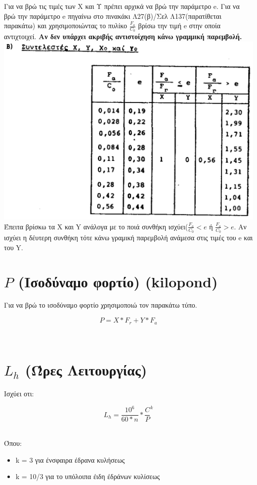 \documentclass{article}
\begin{document}
Για να βρώ τις τιμές των Χ και Υ πρέπει αρχικά να βρώ την παράμετρο e. Για να βρώ την παράμετρο e πηγαίνω στο πινακάκι Λ27(β)/Σελ Λ137(παρατίθεται παρακάτω) και χρησιμοποιώντας το πυλίκο \textbf{$\frac{F_a}{C_0}$} βρίσω την τιμή e στην οποία αντιχτοιχεί. \textbf{Αν δεν υπάρχει ακριβής αντιστοίχηση κάνω γραμμική παρεμβολή.} 
\\
\includegraphics[width=\linewidth]{2.png}
\\Έπειτα βρίσκω τα X και Y ανάλογα με το ποιά συνθήκη ισχύει($\frac{F_a}{C_0} < e$ ή $\frac{F_a}{C_0} > e$. Αν ισχύει η δέυτερη συνθήκη τότε κάνω γραμική παρεμβολή ανάμεσα στις τιμές του e και του Y.

\section{$P$ (Ισοδύναμο φορτίο) \tiny{(kilopond)}}
Για να βρώ το ισοδύναμο φορτίο χρησιμοποιώ τον παρακάτω τύπο.
\begin{center}
    \[ P = X*F_r + Y*F_a \]
\end{center}
\\


\section{$L_h$ (Ώρες Λειτουργίας)}
Ισχύει οτι:
\begin{center}
    \[ L_h = \frac{10^6}{60*n}*\frac{C}{P}^k \]
\end{center}
\\
Όπου:
\begin{itemize}
    \item k = 3 για ένσφαιρα έδρανα κυλήσεως
    \item k = 10/3 για το υπόλοιπα έιδη έδράνων κυλίσεως
\end{itemize}
\end{document}

